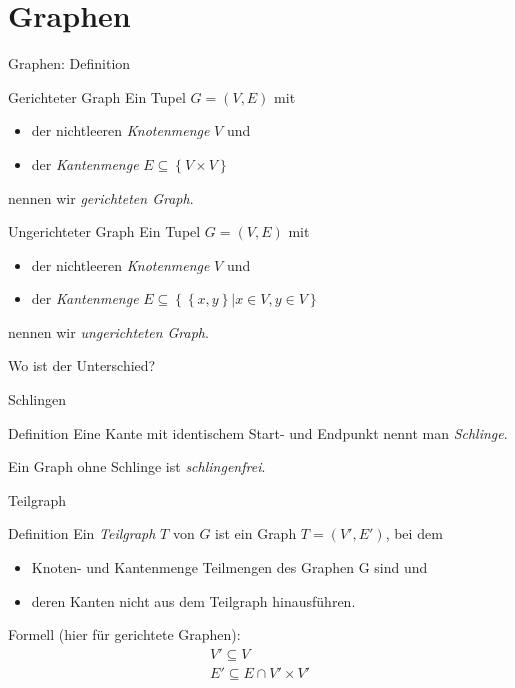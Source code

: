 \section{Graphen}
\begin{frame}{Graphen: Definition}
    \begin{block}{Gerichteter Graph}
        Ein Tupel $G = \left( V, E \right)$ mit 
        \begin{itemize}
            \item der nichtleeren \emph{Knotenmenge} $V$ und
            \item der \emph{Kantenmenge} $E\subseteq \left\{ V \times V \right\}$
        \end{itemize}
        nennen wir \emph{gerichteten Graph}.
    \end{block}
    \pause
    \begin{block}{Ungerichteter Graph}
        Ein Tupel $G = \left( V, E \right)$ mit 
        \begin{itemize}
            \item der nichtleeren \emph{Knotenmenge} $V$ und
            \item der \emph{Kantenmenge} $E\subseteq \left\{ \left\{ x, y \right\} \big| x\in V, y\in V \right\}$
        \end{itemize}
        nennen wir \emph{ungerichteten Graph}.
    \end{block}
    \pause
    Wo ist der Unterschied?
\end{frame}
\begin{frame}{Schlingen}
    \begin{block}{Definition}
        Eine Kante mit identischem Start- und Endpunkt nennt man \emph{Schlinge}.
    \end{block}
    Ein Graph ohne Schlinge ist \emph{schlingenfrei}.
\end{frame}
\begin{frame}{Teilgraph}
    \begin{block}{Definition}
        Ein \emph{Teilgraph} $T$ von $G$ ist ein Graph $T = \left( V', E' \right)$, bei dem
        \begin{itemize}
            \item Knoten- und Kantenmenge Teilmengen des Graphen G sind und
            \item deren Kanten nicht aus dem Teilgraph hinausführen.
        \end{itemize}
        \pause
        Formell (hier für gerichtete Graphen):
        \begin{align*}
            V' \subseteq V\\
            E' \subseteq E \cap V' \times V'
        \end{align*}
    \end{block}
\end{frame}
